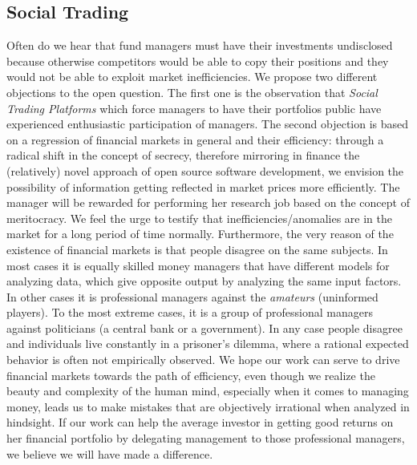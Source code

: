 \documentclass[9pt,oneside]{amsart}
\begin{document}
\begin{multicols}{2}
\section{Social Trading} \label{ch:create}
Often do we hear that fund managers must have their investments undisclosed because otherwise competitors would be able to copy their positions and they would not be able to exploit market inefficiencies. We propose two different objections to the open question. The first one is the observation that \textit{Social Trading Platforms} which force managers to have their portfolios public have experienced enthusiastic participation of managers. The second objection is based on a regression of financial markets in general and their efficiency: through a radical shift in the concept of secrecy, therefore mirroring in finance the (relatively) novel approach of open source software development, we envision the possibility of information getting reflected in market prices more efficiently. The manager will be rewarded for performing her research job based on the concept of meritocracy. We feel the urge to testify that inefficiencies/anomalies are in the market for a long period of time normally. Furthermore, the very reason of the existence of financial markets is that people disagree on the same subjects. In most cases it is equally skilled money managers that have different models for analyzing data, which give opposite output by analyzing the same input factors. In other cases it is professional managers against the \textit{amateurs} (uninformed players). To the most extreme cases, it is a group of professional managers against politicians (a central bank or a government). In any case people disagree and individuals live constantly in a prisoner's dilemma, where a rational expected behavior is often not empirically observed.
We hope our work can serve to drive financial markets towards the path of efficiency, even though we realize the beauty and complexity of the human mind, especially when it comes to managing money, leads us to make mistakes that are objectively irrational when analyzed in hindsight.
If our work can help the average investor in getting good returns on her financial portfolio by delegating management to those professional managers, we believe we will have made a difference.


\end{multicols}
\end{document}
